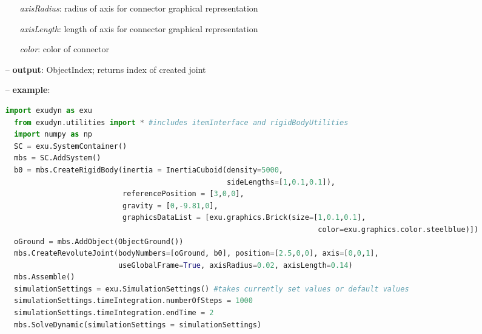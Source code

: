 \begin{itemize}[leftmargin=0.7cm]
\begin{itemize}[leftmargin=1.2cm]
\item[]{\it axisRadius}: radius of axis for connector graphical representation
\item[]{\it axisLength}: length of axis for connector graphical representation
\item[]{\it color}: color of connector
\end{itemize}
\item[--]
{\bf output}: ObjectIndex; returns index of created joint
\item[--]
{\bf example}: \vspace{-12pt}\ei\begin{lstlisting}[language=Python, xleftmargin=36pt]
  import exudyn as exu
  from exudyn.utilities import * #includes itemInterface and rigidBodyUtilities
  import numpy as np
  SC = exu.SystemContainer()
  mbs = SC.AddSystem()
  b0 = mbs.CreateRigidBody(inertia = InertiaCuboid(density=5000,
                                                   sideLengths=[1,0.1,0.1]),
                           referencePosition = [3,0,0],
                           gravity = [0,-9.81,0],
                           graphicsDataList = [exu.graphics.Brick(size=[1,0.1,0.1],
                                                                        color=exu.graphics.color.steelblue)])
  oGround = mbs.AddObject(ObjectGround())
  mbs.CreateRevoluteJoint(bodyNumbers=[oGround, b0], position=[2.5,0,0], axis=[0,0,1],
                          useGlobalFrame=True, axisRadius=0.02, axisLength=0.14)
  mbs.Assemble()
  simulationSettings = exu.SimulationSettings() #takes currently set values or default values
  simulationSettings.timeIntegration.numberOfSteps = 1000
  simulationSettings.timeIntegration.endTime = 2
  mbs.SolveDynamic(simulationSettings = simulationSettings)
\end{lstlisting}\vspace{-24pt}\bi\item[]\vspace{-24pt}\vspace{12pt}\end{itemize}
%

